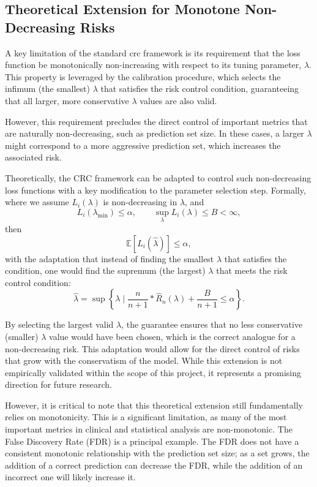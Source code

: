 \subsection{Theoretical Extension for Monotone Non-Decreasing Risks}

A key limitation of the standard \gls{crc} framework
is its requirement that the loss function be monotonically non-increasing
with respect to its tuning parameter, \(\lambda\).
This property is leveraged by the calibration procedure,
which selects the infimum (the smallest) \(\lambda\) that satisfies the risk control condition,
guaranteeing that all larger, more conservative \(\lambda\) values are also valid.

However, this requirement precludes the direct control of important metrics
that are naturally non-decreasing, such as prediction set size.
In these cases, a larger \(\lambda\) might correspond to a more aggressive prediction set,
which increases the associated risk.

Theoretically, the CRC framework can be adapted to control such non-decreasing loss functions
with a key modification to the parameter selection step.
Formally, where we assume \(L_i(\lambda)\) is non-decreasing in \(\lambda\), and
\[
    L_i(\lambda_{\text{min}}) \leq \alpha, \qquad \sup_{\lambda} L_i(\lambda) \leq B < \infty,
\]
then
\[
    \mathbb{E}[L_i(\hat{\lambda})] \leq \alpha,
\]
with the adaptation that instead of finding the smallest \(\lambda\) that satisfies the condition,
one would find the supremum (the largest) \(\lambda\) that meets the risk control condition:
\[
    \hat{\lambda} =
    \sup \left\{ \lambda \mid \frac{n}{n+1} * \hat{R}_n(\lambda) + \frac{B}{n+1} \leq \alpha \right\}.
\]

By selecting the largest valid \(\lambda\),
the guarantee ensures that no less conservative (smaller) \(\lambda\) value would have been chosen,
which is the correct analogue for a non-decreasing risk.
This adaptation would allow for the direct control of risks
that grow with the conservatism of the model.
While this extension is not empirically validated within the scope of this project,
it represents a promising direction for future research.

However, it is critical to note that this theoretical extension
still fundamentally relies on monotonicity.
This is a significant limitation,
as many of the most important metrics in clinical and statistical analysis are non-monotonic.
The False Discovery Rate (FDR) is a principal example.
The FDR does not have a consistent monotonic relationship with the prediction set size;
as a set grows, the addition of a correct prediction can decrease the FDR,
while the addition of an incorrect one will likely increase it.

